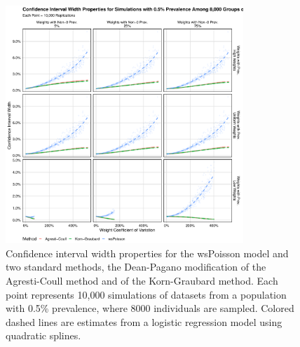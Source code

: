 \begin{figure}
\centering
\includegraphics[width=0.8\textwidth]{perfect_confidence_interval_width_8000_groups_0_005_prev}
\caption{Confidence interval width properties for the wsPoisson model and two standard methods, the Dean-Pagano modification of the Agresti-Coull method and of the Korn-Graubard method.
Each point represents 10,000 simulations of datasets from a population with 0.5\% prevalence, where 8000 individuals are sampled.
Colored dashed lines are estimates from a logistic regression model using quadratic splines.}
\label{ch_3:fig:perfect_confidence_interval_width_8000_groups_0_005_prev}
\end{figure}



